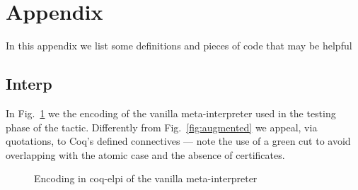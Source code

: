 
\section{Appendix}
\label{sec:app}

In this appendix we list some definitions and pieces of code that may be helpful

\subsection{Interp}


In Fig.~\ref{fig:interp} we the encoding of the vanilla meta-interpreter used in
the testing phase of the  tactic. Differently from Fig.~\ref{fig:augmented} we appeal, via quotations, to Coq's defined connectives --- note the use of a green cut to avoid overlapping with the  atomic case and the absence of certificates.

\begin{figure}
 

\caption{Encoding in coq-elpi of the vanilla meta-interpreter}
\label{fig:interp}
%
%
\end{figure}


